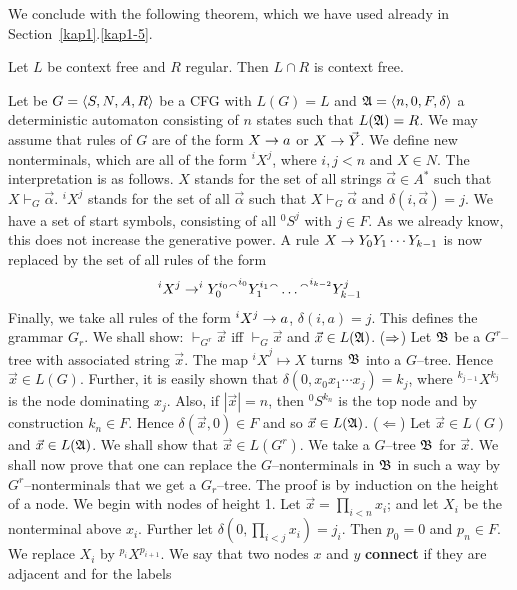 We conclude with the following theorem, which we have used
already in Section~\ref{kap1}.\ref{kap1-5}.
\begin{thm}
\label{thm:cfintersekt} Let $L$ be context free and $R$
regular. Then $L \cap R$ is context free.
\end{thm}
\proofbeg
Let be $G = \langle S, N, A, R\rangle$ be a CFG
with $L(G) = L$ and $\mathfrak{A} = \langle n, 0, F, \delta\rangle$
a deterministic automaton consisting of $n$  states such that
$L(\mathfrak{A}) = R$. We may assume that rules of $G$ are of the form
$X \rightarrow a$ or $X \rightarrow \vec{Y}$. We define new nonterminals, which
are all of the form $^i X^j$, where $i, j < n$ and $X \in N$. The
interpretation is as follows. $X$ stands for the set of all
strings $\vec{\alpha} \in A^{\ast}$ such that $X \vdash_G
\vec{\alpha}$. $^i X^j$ stands for the set of all
$\vec{\alpha}$ such that $X \vdash_G \vec{\alpha}$ and
$\delta(i,\vec{\alpha}) = j$. We have a set of start symbols,
consisting of all $^0 S^{j}$ with $j \in F$. As we already know,
this does not increase the generative power. A rule 
$X \rightarrow Y_0 Y_1 \dotsb Y_{k-1}$ is now replaced by the set of all
rules of the form
\begin{equation}
^i X^j \rightarrow ^i Y_0^{i_0}{^{\smallfrown}} ^{i_0}Y_1^{i_1} {^{\smallfrown}} \dotso
{^{\smallfrown}} ^{i_{k-2}}Y_{k-1}^j
\end{equation}
Finally, we take all rules of the form $^i X^j \rightarrow a$,
$\delta(i,a) = j$. This defines the grammar $G_r$. We shall show:
$\vdash_{G^r} \vec{x}$ iff $\vdash_G \vec{x}$ and
$\vec{x} \in L(\mathfrak{A})$. ($\Rightarrow$) Let $\mathfrak{B}$ be a $G^r$--tree with
associated string $\vec{x}$. The map ${^i X}^j \mapsto X$ turns
$\mathfrak{B}$ into a $G$--tree. Hence $\vec{x} \in L(G)$. Further, it
is easily shown that $\delta(0,x_0x_1\dotsb x_j) = k_j$, where
$^{k_{j-1}} X^{k_j}$ is the node dominating $x_j$.
Also, if $|\vec{x}| = n$, then $^0 S^{k_n}$ is the top node
and by construction $k_n \in F$. Hence $\delta(\vec{x}, 0)
\in F$ and so $\vec{x} \in L(\mathfrak{A})$.
($\Leftarrow$) Let $\vec{x} \in L(G)$ and $\vec{x} \in L(\mathfrak{A})$.
We shall show that $\vec{x} \in L(G^r)$. We take a $G$--tree
$\mathfrak{B}$ for $\vec{x}$.  We shall now prove that one can replace the
$G$--nonterminals in $\mathfrak{B}$ in such a way by $G^r$--nonterminals
that we get a $G_r$--tree. The proof is by induction on the height
of a node. We begin with nodes of height 1. Let
$\vec{x} = \prod_{i < n} x_i$; and let $X_i$ be the nonterminal
above $x_i$. Further let $\delta(0,\prod_{i < j} x_i) =
j_i$. Then $p_0 = 0$ and $p_n \in F$. We replace $X_i$ by
$^{p_i} X^{p_{i+1}}$. We say that two nodes $x$ and
$y$ \textbf{connect} if they are adjacent and for the labels
